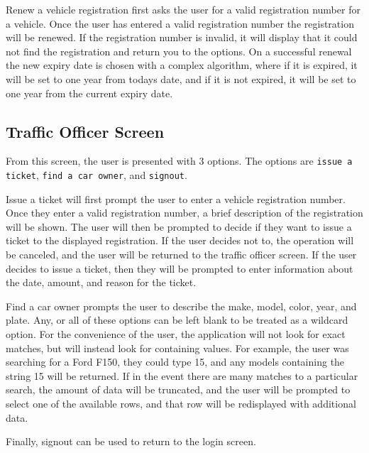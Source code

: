 Renew a vehicle registration first asks the user for a valid registration
number for a vehicle. Once the user has entered a valid registration number the
registration will be renewed. If the registration number is invalid, it will
display that it could not find the registration and return you to the options.
On a successful renewal the new expiry date is chosen with a complex algorithm,
where if it is expired, it will be set to one year from todays date, and if it
is not expired, it will be set to one year from the current expiry date.


\subsection{Traffic Officer Screen}

From this screen, the user is presented with 3 options. The options are
\verb|issue a ticket|, \verb|find a car owner|, and \verb|signout|.

Issue a ticket will first prompt the user to enter a vehicle registration
number. Once they enter a valid registration number, a brief description of the
registration will be shown. The user will then be prompted to decide if they
want to issue a ticket to the displayed registration. If the user decides not
to, the operation will be canceled, and the user will be returned to the
traffic officer screen. If the user decides to issue a ticket, then they will
be prompted to enter information about the date, amount, and reason for the
ticket.

Find a car owner prompts the user to describe the make, model, color, year, and
plate. Any, or all of these options can be left blank to be treated as a
wildcard option. For the convenience of the user, the application will not look
for exact matches, but will instead look for containing values. For example, the
user was searching for a Ford F150, they could type 15, and any models
containing the string 15 will be returned. If in the event there are many
matches to a particular search, the amount of data will be truncated, and the
user will be prompted to select one of the available rows, and that row will be
redisplayed with additional data.

Finally, signout can be used to return to the login screen.

